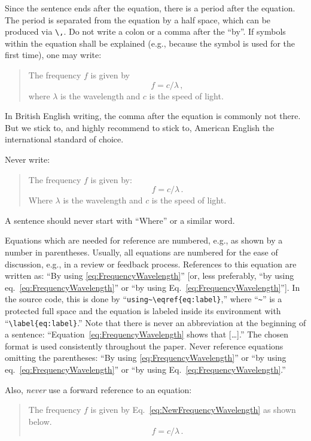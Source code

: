 Since the sentence ends after the equation, there is a period after the equation.
The period is separated from the equation by a half space, which can be produced via \verb|\,|.
Do not write a colon or a comma after the ``by''.
If symbols within the equation shall be explained (e.g., because the symbol is used for the first time), one may write:
\begin{quote}
    \small
    The frequency $f$ is given by 
    \begin{equation}
        f = c /\lambda \, , \label{eq:FrequencyWavelength}
    \end{equation}
    where $\lambda$ is the wavelength and $c$ is the speed of light.
\end{quote}
In British English writing, the comma after the equation is commonly not there. 
But we stick to, and highly recommend to stick to, American English the international standard of choice. 

Never write:
\begin{quote}
    \small
    The frequency $f$ is given by:
    \begin{equation}
        f = c /\lambda\, .
    \end{equation}
    Where $\lambda$ is the wavelength and $c$ is the speed of light.
\end{quote}
A sentence should never start with ``Where'' or a similar word.

Equations which are needed for reference are numbered, e.g., as shown by a number in parentheses. 
Usually, all equations are numbered for the ease of discussion, e.g., in a review or feedback process. 
References to this equation are written as: ``By using \eqref{eq:FrequencyWavelength}'' [or, less preferably,  ``by using eq.~\eqref{eq:FrequencyWavelength}'' or ``by using Eq.~\eqref{eq:FrequencyWavelength}'']. 
In the source code, this is done by “\verb|using~\eqref{eq:label}|,” where “\verb|~|” is a protected full space and the equation is labeled inside its environment with “\verb|\label{eq:label}|.” 
Note that there is never an abbreviation at the beginning of a sentence: ``Equation~\eqref{eq:FrequencyWavelength} shows that [\dots].''
The chosen format is used consistently throughout the paper.
Never reference equations omitting the parentheses: ``By using \ref{eq:FrequencyWavelength}'' or ``by using eq.~\ref{eq:FrequencyWavelength}'' or ``by using Eq.~\ref{eq:FrequencyWavelength}.''

Also, \emph{never} use a forward reference to an equation:
\begin{quote}
    \small
    The frequency $f$ is given by Eq.~\eqref{eq:NewFrequencyWavelength} as shown below.
    \begin{equation}
        f = c /\lambda\, . \label{eq:NewFrequencyWavelength}
    \end{equation}
\end{quote}

